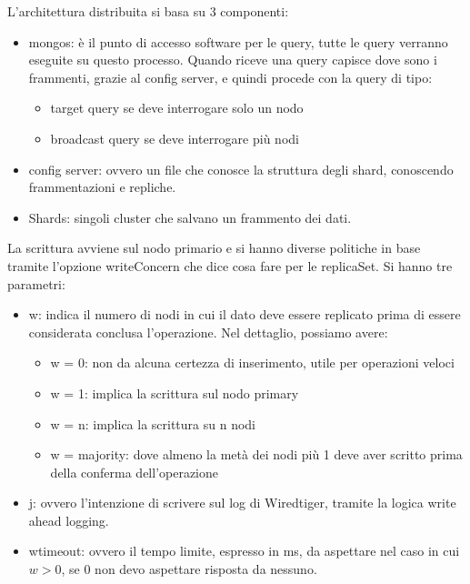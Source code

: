 L'architettura distribuita si basa su 3 componenti:
\begin{itemize}
      \item mongos: è il punto di accesso software per le query, tutte le query
            verranno eseguite su questo processo. Quando riceve una query capisce
            dove sono i frammenti, grazie al config server, e quindi procede con
            la query di tipo:
            \begin{itemize}
                  \item target query se deve interrogare solo un nodo
                  \item broadcast query se deve interrogare più nodi
            \end{itemize}
      \item config server: ovvero un file che conosce la struttura degli shard,
            conoscendo frammentazioni e repliche.
      \item Shards: singoli cluster che salvano un frammento dei dati.
\end{itemize}
La scrittura avviene sul nodo primario e si hanno diverse politiche in base
tramite l'opzione writeConcern che dice cosa fare per le replicaSet. Si hanno
tre parametri:
\begin{itemize}
      \item w: indica il numero di nodi in cui il dato deve essere replicato
            prima di essere considerata conclusa l'operazione. Nel dettaglio,
            possiamo avere:
            \begin{itemize}
                  \item w = 0: non da alcuna certezza di inserimento, utile per
                        operazioni veloci
                  \item w = 1: implica la scrittura sul nodo primary
                  \item w = n: implica la scrittura su n nodi
                  \item w = majority: dove almeno la metà dei nodi più 1 deve aver
                        scritto prima della conferma dell'operazione
            \end{itemize}
      \item j: ovvero l'intenzione di scrivere sul log di Wiredtiger, tramite la
            logica write ahead logging.
      \item wtimeout: ovvero il tempo limite, espresso in ms, da aspettare nel
            caso in cui $w > 0$, se 0 non devo aspettare risposta da nessuno.
\end{itemize}
